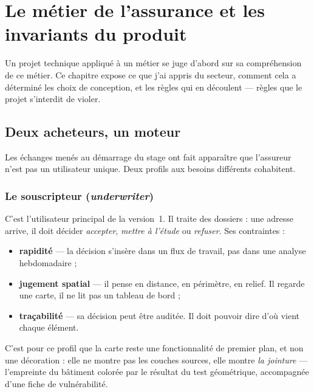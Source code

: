 \chapter{Le métier de l'assurance et les invariants du produit}
\label{ch:metier}

Un projet technique appliqué à un métier se juge d'abord sur sa compréhension
de ce métier. Ce chapitre expose ce que j'ai appris du secteur, comment cela a
déterminé les choix de conception, et les règles qui en découlent — règles que
le projet s'interdit de violer.

\section{Deux acheteurs, un moteur}

Les échanges menés au démarrage du stage ont fait apparaître que \og
l'assureur \fg{} n'est pas un utilisateur unique. Deux profils aux besoins
différents cohabitent.

\subsection{Le souscripteur (\emph{underwriter})}

C'est l'utilisateur principal de la version~1. Il traite des dossiers : une
adresse arrive, il doit décider \emph{accepter}, \emph{mettre à l'étude} ou
\emph{refuser}. Ses contraintes :

\begin{itemize}[leftmargin=1.4em]
  \item \textbf{rapidité} — la décision s'insère dans un flux de travail, pas
        dans une analyse hebdomadaire ;
  \item \textbf{jugement spatial} — il pense en distance, en périmètre, en
        relief. Il regarde une carte, il ne lit pas un tableau de bord ;
  \item \textbf{traçabilité} — sa décision peut être auditée. Il doit pouvoir
        dire d'où vient chaque élément.
\end{itemize}

C'est pour ce profil que la carte reste une fonctionnalité de premier plan,
et non une décoration : elle ne montre pas les couches sources, elle montre
\emph{la jointure} — l'empreinte du bâtiment colorée par le résultat du test
géométrique, accompagnée d'une fiche de vulnérabilité.

